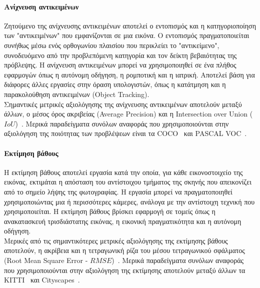 \documentclass[12pt]{article}
\numberwithin{equation}{section}
\begin{document}
\paragraph{Ανίχνευση αντικειμένων \\ [0.5cm]}

Ζητούμενο της ανίχνευσης αντικειμένων αποτελεί ο εντοπισμός και η κατηγοριοποίηση των "αντικειμένων" που εμφανίζονται σε μια εικόνα. Ο εντοπισμός πραγματοποιείται συνήθως μέσω ενός ορθογωνίου πλαισίου που περικλείει το "αντικείμενο", συνοδευόμενο από την προβλεπόμενη κατηγορία και τον δείκτη βεβαιότητας της πρόβλεψης. Η ανίχνευση αντικειμένων μπορεί να χρησιμοποιηθεί σε ένα πλήθος εφαρμογών όπως η αυτόνομη οδήγηση, η ρομποτική και η ιατρική. Αποτελεί βάση για διάφορες άλλες εργασίες στην όραση υπολογιστών, όπως η κατάτμηση και η παρακολούθηση αντικειμένων (Object Tracking).\\

Σημαντικές μετρικές αξιολόγησης της ανίχνευσης αντικειμένων αποτελούν μεταξύ άλλων, ο  μέσος όρος ακριβείας (Average Precision) και η Intersection over Union (\(IoU\))~\cite{zou2023objectdetection20years}. Μερικά παραδείγματα συνόλων αναφοράς που χρησιμοποιούνται στην αξιολόγηση της ποιότητας των προβλέψεων είναι τα COCO~\cite{lin2015microsoftcococommonobjects} και PASCAL VOC~\cite{Everingham2010}.\\

\paragraph{Εκτίμηση βάθους\\ [0.5 cm]}

Η εκτίμηση βάθους αποτελεί εργασία κατά την οποία, για κάθε εικονοστοιχείο της εικόνας, εκτιμάται η απόσταση του αντίστοιχου τμήματος της σκηνής που απεικονίζει από το σημείο λήψης της φωτογραφίας. Η εργασία μπορεί να πραγματοποιηθεί χρησιμοποιώντας μια ή περισσότερες κάμερες, ανάλογα με την αντίστοιχη τεχνική που χρησιμοποιείται. Η εκτίμηση βάθους βρίσκει εφαρμογή σε τομείς όπως η ανακατασκευή τρισδιάστατης εικόνας, η εικονική πραγματικότητα και η αυτόνομη οδήγηση. \\

Μερικές από τις σημαντικότερες μετρικές αξιολόγησης της εκτίμησης βάθους αποτελούν, η ακρίβεια και η τετραγωνική ρίζα του μέσου τετραγωνικού σφάλματος (Root Mean Square Error - \(RMSE\))~\cite{rohan2025systematicliteraturereviewdeep}. Μερικά παραδείγματα συνόλων αναφοράς που χρησιμοποιούνται στην αξιολόγηση  της εκτίμησης αποτελούν μεταξύ άλλων τα KITTI~\cite{Geiger2013IJRR} και Cityscapes~\cite{DBLP:journals/corr/CordtsORREBFRS16}.\\
\end{document}
